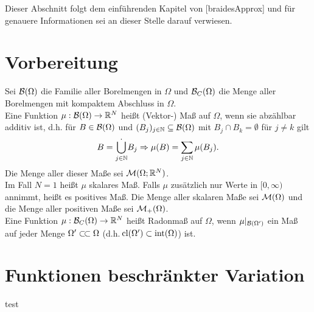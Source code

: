 Dieser Abschnitt folgt dem einführenden Kapitel von [braidesApprox] und für
genauere Informationen sei an dieser Stelle darauf verwiesen.

\section{Vorbereitung}

\begin{definition}
  Sei $\mathcal{B}(\Omega)$ die Familie aller Borelmengen in $\Omega$ und
  $\mathcal{B}_C(\Omega)$ die Menge aller Borelmengen mit kompaktem Abschluss in
  $\Omega$. \\
  Eine Funktion $\mu:\mathcal{B}(\Omega)\to\mathbb{R}^N$ heißt (Vektor-) Maß auf $\Omega$,
  wenn sie abzählbar additiv ist, d.h. für $B\in \mathcal{B}(\Omega)$ und
  $(B_j)_{j\in\mathbb{N}}\subseteq\mathcal{B}(\Omega)$ mit $B_j \cap B_k = \emptyset$ für
  $j\neq k$ gilt
  \begin{align*}
    B=\dot{\bigcup_{j\in\mathbb{N}}} B_j \Rightarrow \mu(B) = \sum_{j\in\mathbb{N}} \mu(B_j).
  \end{align*}
  Die Menge aller dieser Maße sei $\mathcal{M}(\Omega;\mathbb{R}^N)$.\\

  Im Fall $N=1$ heißt $\mu$ skalares Maß. Falls $\mu$ zusätzlich nur Werte in 
  $[0,\infty)$
  annimmt, heißt es positives Maß. Die Menge aller skalaren Maße sei 
  $\mathcal{M}(\Omega)$ und die Menge aller positiven Maße sei 
  $\mathcal{M}_+(\Omega)$.\\
  Eine Funktion $\mu:\mathcal{B}_C(\Omega)\to\mathbb{R}^N$ heißt Radonmaß auf 
  $\Omega$, wenn $\mu|_{\mathcal{B}(\Omega')}$ ein Maß auf jeder Menge 
  $\Omega'\ssubset \Omega$ (d.h.\,$\operatorname{cl}({\Omega'})\subset \operatorname{int}({\Omega})$) 
  ist. \\


    
\end{definition}

\section{Funktionen beschränkter Variation}
test
